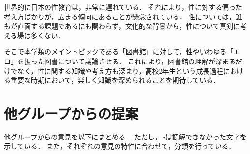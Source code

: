 \documentclass[pdflatex,ja=standard]{bxjsarticle}
\begin{document}
世界的に日本の性教育は，非常に遅れている．
それにより，性に対する偏った考え方ばかりが，広まる傾向にあることが懸念されている．
性については，誰もが直面する課題であるにも関わらず，文化的な背景から，性について真剣に考える場は多くない．

そこで本学類のメイントピックである「図書館」に対して，性やいわゆる「エロ」を扱った図書について議論させる．
これにより，図書館の理解が深まるだけでなく，性に関する知識や考え方も深まり，高校2年生という成長過程における重要な時期において，楽しく知識を深められることを期待している．


\section{他グループからの提案}
他グループからの意見を以下にまとめる．
ただし，$x$は読解できなかった文字を示している．
また，それぞれの意見の特性に合わせて，分類を行っている．
\end{document}
